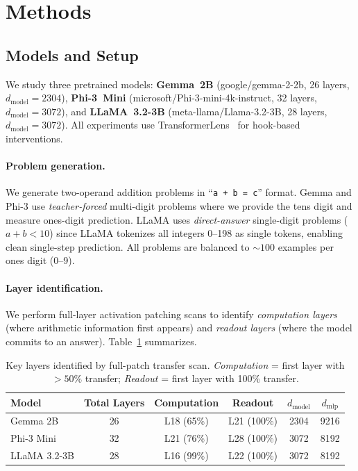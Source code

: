 \section{Methods}
\label{sec:methods}

\subsection{Models and Setup}

We study three pretrained models: \textbf{Gemma~2B} (google/gemma-2-2b, 26 layers, $d_\text{model}{=}2304$), \textbf{Phi-3~Mini} (microsoft/Phi-3-mini-4k-instruct, 32 layers, $d_\text{model}{=}3072$), and \textbf{LLaMA~3.2-3B} (meta-llama/Llama-3.2-3B, 28 layers, $d_\text{model}{=}3072$). All experiments use TransformerLens~\citep{nanda2022transformerlens} for hook-based interventions.

\paragraph{Problem generation.} We generate two-operand addition problems in ``\texttt{a + b = c}'' format. Gemma and Phi-3 use \emph{teacher-forced} multi-digit problems where we provide the tens digit and measure ones-digit prediction. LLaMA uses \emph{direct-answer} single-digit problems ($a + b < 10$) since LLaMA tokenizes all integers 0--198 as single tokens, enabling clean single-step prediction. All problems are balanced to ${\sim}100$ examples per ones digit (0--9).

\paragraph{Layer identification.} We perform full-layer activation patching scans to identify \emph{computation layers} (where arithmetic information first appears) and \emph{readout layers} (where the model commits to an answer). Table~\ref{tab:layers} summarizes.

\begin{table}[t]
\centering
\caption{Key layers identified by full-patch transfer scan. \emph{Computation} = first layer with ${>}50\%$ transfer; \emph{Readout} = first layer with 100\% transfer.}
\label{tab:layers}
\small
\begin{tabular}{lccccc}
\toprule
\textbf{Model} & \textbf{Total Layers} & \textbf{Computation} & \textbf{Readout} & \textbf{$d_\text{model}$} & \textbf{$d_\text{mlp}$} \\
\midrule
Gemma 2B & 26 & L18 (65\%) & L21 (100\%) & 2304 & 9216 \\
Phi-3 Mini & 32 & L21 (76\%) & L28 (100\%) & 3072 & 8192 \\
LLaMA 3.2-3B & 28 & L16 (99\%) & L22 (100\%) & 3072 & 8192 \\
\bottomrule
\end{tabular}
\end{table}

